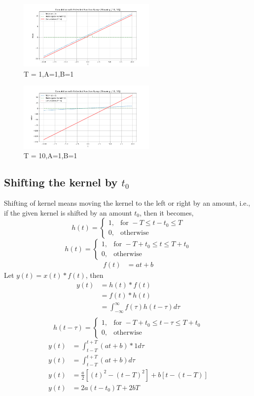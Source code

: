 \begin{figure}[h]
    \centering
    \includegraphics[width=0.6\textwidth]{figsm/3.png}
    \caption{T = 1,A=1,B=1}
    \label{fig:conv_sinc}
\end{figure}
\begin{figure}[h]
    \centering
    \includegraphics[width=0.6\textwidth]{figsm/4.png}
    \caption{T = 10,A=1,B=1}
    \label{fig:conv_sinc}
\end{figure}
\newpage

\subsection{Shifting the kernel by $t_{0}$}
Shifting of kernel means moving the kernel to the left or right by an amount, i.e., if the given kernel is shifted by an amount $t_0$, then it becomes, 
\[
h(t) =
\begin{cases}
1, & \text{for } -T \leq t-t_0 \leq T \\
0, & \text{otherwise}
\end{cases}
\]
\[
h(t) =
\begin{cases}
1, & \text{for } -T+t_0 \leq t \leq T+t_0 \\
0, & \text{otherwise}
\end{cases}
\]
\begin{align*}
f(t) &= at+b
\end{align*}
Let $y(t) = x(t) * f(t)$, then
\begin{align*}
	y(t) &= h(t) * f(t) \\
             &= f(t) * h(t) \\
             &= \int_{-\infty}^{\infty} f(\tau) h(t - \tau) d \tau \\
\end{align*}
\[
h(t - \tau) =
\begin{cases}
1, & \text{for } -T+t_0 \leq t - \tau \leq T+t_0 \\
0, & \text{otherwise}
\end{cases}
\]
\begin{align*}
	y(t) &= \int_{t - T}^{t + T} (at+b)* 1 d\tau \\
	y(t) &= \int_{t - T}^{t + T}  (at+b)d\tau\\
    y(t) &= \frac{a}{2}[(t)^2-(t-T)^2]+b[t-(t-T)]\\
    y(t) &= 2a(t-t_0)T+2bT
\end{align*}

